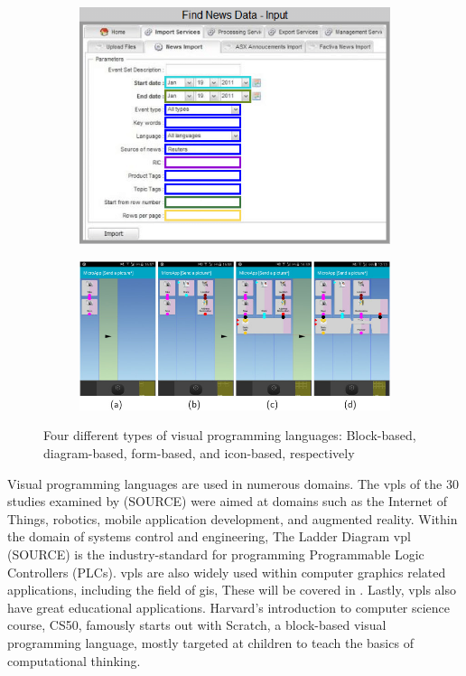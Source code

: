\begin{figure}
\begin{subfigure}[c]{0.45\linewidth}
  \includegraphics[width=\linewidth]{form-based.png}
  \caption{}\label{fig:vpl-types:3}
\end{subfigure}%
\qquad %
\begin{subfigure}[d]{0.45\linewidth}
  \centering
  \graphicspath{{../../assets/images/background/vpl/}}
  \includegraphics[width=\linewidth]{icon-based.jpg}
  \caption{}\label{fig:vpl-types:4}
\end{subfigure}%
\caption[Types of \ac{vpl}s]{Four different types of visual programming languages: Block-based, diagram-based, form-based, and icon-based, respectively}%
\label{fig:vpl-types}
\end{figure}

Visual programming languages are used in numerous domains. 
The vpls of the 30 studies examined by (SOURCE) were aimed at domains such as the Internet of Things, robotics, mobile application development, and augmented reality. 
Within the domain of systems control and engineering, The Ladder Diagram vpl (SOURCE) is the industry-standard for programming Programmable Logic Controllers (PLCs).
\ac{vpl}s are also widely used within computer graphics related applications, including the field of \ac{gis}, 
These will be covered in .
Lastly, \ac{vpl}s also have great educational applications. 
Harvard's introduction to computer science course, CS50, famously starts out with Scratch, a block-based visual programming language, mostly targeted at children to teach the basics of computational thinking. 

